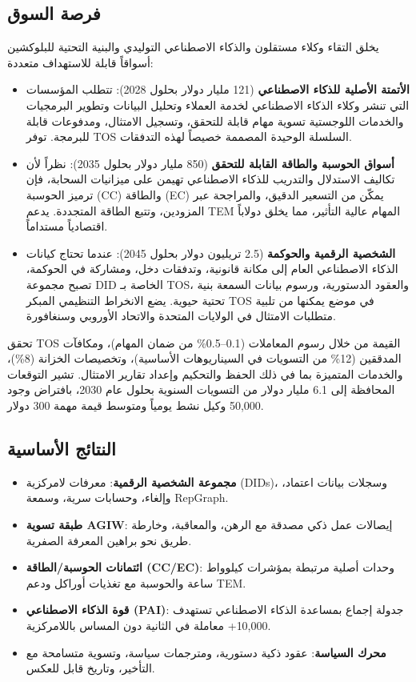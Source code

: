 \documentclass[11pt]{article}
\begin{document}
\subsection{فرصة السوق}
يخلق التقاء وكلاء مستقلون والذكاء الاصطناعي التوليدي والبنية التحتية للبلوكشين أسواقاً قابلة للاستهداف متعددة:
\begin{itemize}[noitemsep]
  \item \textbf{الأتمتة الأصلية للذكاء الاصطناعي} (121 مليار دولار بحلول 2028): تتطلب المؤسسات التي تنشر وكلاء الذكاء الاصطناعي لخدمة العملاء وتحليل البيانات وتطوير البرمجيات والخدمات اللوجستية تسوية مهام قابلة للتحقق، وتسجيل الامتثال، ومدفوعات قابلة للبرمجة. توفر TOS السلسلة الوحيدة المصممة خصيصاً لهذه التدفقات.
  \item \textbf{أسواق الحوسبة والطاقة القابلة للتحقق} (850 مليار دولار بحلول 2035): نظراً لأن تكاليف الاستدلال والتدريب للذكاء الاصطناعي تهيمن على ميزانيات السحابة، فإن ترميز الحوسبة (CC) والطاقة (EC) يمكّن من التسعير الدقيق، والمراجحة عبر المزودين، وتتبع الطاقة المتجددة. يدعم TEM المهام عالية التأثير، مما يخلق دولاباً اقتصادياً مستداماً.
  \item \textbf{الشخصية الرقمية والحوكمة} (2.5 تريليون دولار بحلول 2045): عندما تحتاج كيانات الذكاء الاصطناعي العام إلى مكانة قانونية، وتدفقات دخل، ومشاركة في الحوكمة، تصبح مجموعة DID الخاصة بـ TOS، والعقود الدستورية، ورسوم بيانات السمعة بنية تحتية حيوية. يضع الانخراط التنظيمي المبكر TOS في موضع يمكنها من تلبية متطلبات الامتثال في الولايات المتحدة والاتحاد الأوروبي وسنغافورة.
\end{itemize}

تحقق TOS القيمة من خلال رسوم المعاملات (0.1--0.5\% من ضمان المهام)، ومكافآت المدققين (12\% من التسويات في السيناريوهات الأساسية)، وتخصيصات الخزانة (8\%)، والخدمات المتميزة بما في ذلك الحفظ والتحكيم وإعداد تقارير الامتثال. تشير التوقعات المحافظة إلى 6.1 مليار دولار من التسويات السنوية بحلول عام 2030، بافتراض وجود 50,000 وكيل نشط يومياً ومتوسط قيمة مهمة 300 دولار.

\subsection{النتائج الأساسية}
\begin{itemize}[noitemsep]
  \item \textbf{مجموعة الشخصية الرقمية}: معرفات لامركزية (DIDs)، وسجلات بيانات اعتماد، وإلغاء، وحسابات سرية، وسمعة RepGraph.
  \item \textbf{طبقة تسوية AGIW}: إيصالات عمل ذكي مصدقة مع الرهن، والمعاقبة، وخارطة طريق نحو براهين المعرفة الصفرية.
  \item \textbf{ائتمانات الحوسبة/الطاقة (CC/EC)}: وحدات أصلية مرتبطة بمؤشرات كيلوواط ساعة والحوسبة مع تغذيات أوراكل ودعم TEM.
  \item \textbf{قوة الذكاء الاصطناعي (PAI)}: جدولة إجماع بمساعدة الذكاء الاصطناعي تستهدف 10,000+ معاملة في الثانية دون المساس باللامركزية.
  \item \textbf{محرك السياسة}: عقود ذكية دستورية، ومترجمات سياسة، وتسوية متسامحة مع التأخير، وتاريخ قابل للعكس.
\end{itemize}
\end{document}
